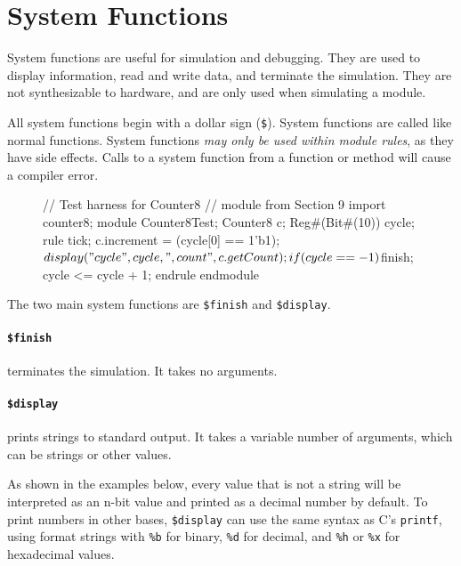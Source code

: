 \section{System Functions}
\label{sec:systemFunctions}

System functions are useful for simulation and debugging. 
They are used to display information, read and write data,
and terminate the simulation.
They are not synthesizable to hardware,
and are only used when simulating a module.

All system functions begin with a dollar sign (\verb|$|).
System functions are called like normal functions.
System functions \emph{may only be used within module rules}, as they have side effects.
Calls to a system function from a function or method will cause a compiler error.

\begin{wrapfigure}{r}{0.32\columnwidth}
\vspace{-6em}
\begin{mscode}
// Test harness for Counter8
// module from Section 9
import counter8;
module Counter8Test;
  Counter8 c;
  Reg#(Bit#(10)) cycle;
  rule tick;
    c.increment =
     (cycle[0] == 1'b1);
    $display("cycle ", cycle,
     ", count ", c.getCount);
    if (cycle == -1) $finish;
    cycle <= cycle + 1;
  endrule
endmodule
\end{mscode}
\vspace{-6em}
\end{wrapfigure}

The two main system functions are \verb|$finish| and \verb|$display|.

\paragraph{\texttt{\$finish}} terminates the simulation. It takes no arguments.

\paragraph{\texttt{\$display}} prints strings to standard output.
It takes a variable number of arguments, which can be strings or other values.

As shown in the examples below, every value that is not a string will be interpreted as an n-bit value and printed as a decimal number by default.
To print numbers in other bases, \verb|$display| can use the same syntax as C's \verb|printf|,
using format strings with \verb|%b| for binary, \verb|%d| for decimal, and \verb|%h| or \verb|%x| for hexadecimal values.

